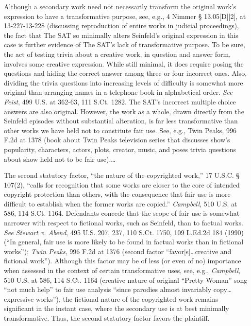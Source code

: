 Although a secondary work need not necessarily transform the original work's
expression to have a transformative purpose, see, e.g., 4 Nimmer {\S}
13.05[D][2], at 13-227-13-228 (discussing reproduction of entire works in
judicial proceedings), the fact that The SAT so minimally alters Seinfeld's
original expression in this case is further evidence of The SAT's lack of
transformative purpose. To be sure, the act of testing trivia about a creative
work, in question and answer form, involves some creative expression. While
still minimal, it does require posing the questions and hiding the correct
answer among three or four incorrect ones. Also, dividing the
trivia questions into increasing levels of difficulty is somewhat more original
than arranging names in a telephone book in alphabetical order. \emph{See}
\emph{Feist}, 499
U.S. at 362-63, 111 S.Ct. 1282. The SAT's incorrect multiple choice answers are
also original. However, the work as a whole, drawn directly from the Seinfeld
episodes without substantial alteration, is far less transformative than other
works we have held not to constitute fair use. See, e.g., Twin Peaks, 996 F.2d
at 1378 (book about Twin Peaks television series that discusses show's
popularity, characters, actors, plots, creator, music, and poses trivia
questions about show held not to be fair use).\ldots


The second statutory factor, ``the nature of the copyrighted work,'' 17 U.S.C.
{\S} 107(2), ``calls for recognition that some works are closer to the core of
intended copyright protection than others, with the consequence that fair use
is more difficult to establish when the former works are copied.''
\emph{Campbell},
510 U.S. at 586, 114 S.Ct. 1164. Defendants concede that the scope of fair use
is somewhat narrower with respect to fictional works, such as Seinfeld, than to
factual works. \emph{See} \emph{Stewart v. Abend}, 495 U.S. 207, 237, 110 S.Ct.
1750, 109
L.Ed.2d 184 (1990) (``In general, fair use is more likely to be found in
factual works than in fictional works''); \emph{Twin Peaks}, 996 F.2d at 1376 (second
factor ``favor[s]\ldots creative and fictional work''). Although this factor may
be of less (or even of no) importance when assessed in the context of certain
transformative uses, see, e.g., \emph{Campbell}, 510 U.S. at 586, 114 S.Ct. 1164
(creative nature of original ``Pretty Woman'' song ``not much help'' to fair
use analysis ``since parodies almost invariably copy\ldots expressive works''),
the fictional nature of the copyrighted work remains significant in the instant
case, where the secondary use is at best minimally transformative. Thus, the
second statutory factor favors the plaintiff.

